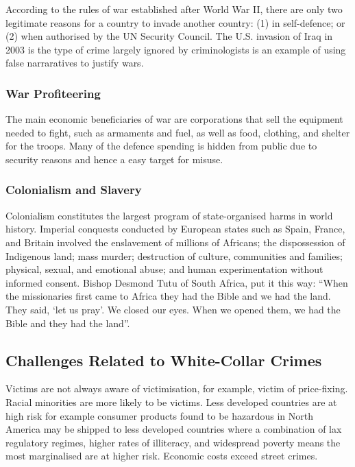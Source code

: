 \documentclass{article}
\begin{document}
According to the rules of war established after World War II, there are only two legitimate reasons for a country to invade another country: (1) in self-defence; or (2) when authorised by the UN Security Council. The U.S. invasion of Iraq in 2003 is the type of crime largely ignored by criminologists is an example of using false narraratives to justify wars.

\subsubsection*{War Profiteering}

The main economic beneficiaries of war are corporations that sell the equipment needed to fight, such as armaments and fuel, as well as food, clothing, and shelter for the troops. Many of the defence spending is hidden from public due to security reasons and hence a easy target for misuse.

\subsubsection*{Colonialism and Slavery}

Colonialism constitutes the largest program of state-organised harms in world history. Imperial conquests conducted by European states such as Spain, France, and Britain involved the enslavement of millions of Africans; the dispossession of Indigenous land; mass murder; destruction of culture, communities and families; physical, sexual, and emotional abuse; and human experimentation without informed consent. Bishop Desmond Tutu of South Africa, put it this way: “When the missionaries first came to Africa they had the Bible and we had the land. They said, ‘let us pray’. We closed our eyes. When we opened them, we had the Bible and they had the land”.

\subsection{Challenges Related to White-Collar Crimes}

Victims are not always aware of victimisation, for example, victim of price-fixing. Racial minorities are more likely to be victims. Less developed countries are at high risk for example consumer products found to be hazardous in North America may be shipped to less developed countries where a combination of lax regulatory regimes, higher rates of illiteracy, and widespread poverty means the most marginalised are at higher risk. Economic costs exceed street crimes.
\end{document}
